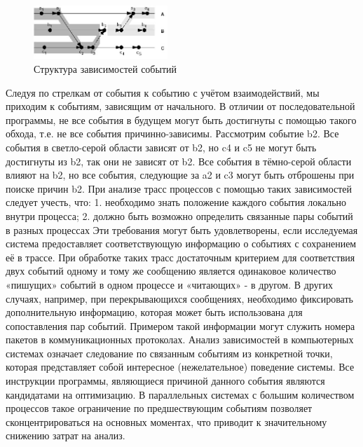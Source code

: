 \begin{figure}[h!]
	\centering
	\includegraphics[width=0.45\textwidth]{img/img5.jpg}
	
	\caption{Структура зависимостей  событий}
	\label{fig:spire08}
\end{figure}

Следуя по стрелкам от события к событию с учётом взаимодействий, мы приходим к событиям, зависящим от начального. В отличии от последовательной программы, не все события в будущем могут быть достигнуты с помощью такого обхода, т.е. не все события причинно-зависимы. Рассмотрим событие b2. Все события в светло-серой области зависят от b2, но c4 и c5 не могут быть достигнуты из b2, так они не зависят от b2. Все события в тёмно-серой области влияют на b2, но все события, следующие за a2 и c3 могут быть отброшены при поиске причин b2.
При анализе трасс процессов с помощью таких зависимостей следует учесть, что:
1. необходимо знать положение каждого события локально внутри процесса;
2. должно быть возможно определить связанные пары событий в разных процессах
Эти требования могут быть удовлетворены, если исследуемая система предоставляет соответствующую информацию о событиях с сохранением её в трассе. При обработке таких трасс достаточным критерием для соответствия двух событий одному и тому же сообщению является одинаковое количество «пишущих» событий в одном процессе и «читающих» - в другом. В других случаях, например, при перекрывающихся  сообщениях, необходимо фиксировать дополнительную информацию, которая может быть использована для сопоставления пар событий. Примером такой информации могут служить номера пакетов в коммуникационных протоколах.
Анализ зависимостей в компьютерных системах означает следование по связанным событиям из конкретной точки, которая представляет собой интересное (нежелательное) поведение системы. Все инструкции программы, являющиеся причиной данного события являются кандидатами на оптимизацию. В параллельных системах с большим количеством процессов такое ограничение по предшествующим событиям позволяет сконцентрироваться на основных моментах, что приводит к значительному снижению затрат на анализ. 
